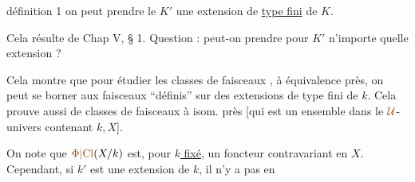définition 1 on peut prendre le $K'$ une extension de \uline{type fini} de $K$.

Cela résulte de Chap V, § 1. Question : peut-on prendre pour $K'$ n'importe quelle extension \uline{} ?

Cela montre que pour étudier les  classes de faisceaux , à équivalence près, on peut se borner aux faisceaux ``définis'' sur des extensions de type fini de $k$.
Cela prouve aussi   de classes de faisceaux à isom. près [qui est un ensemble dans le $\unsure{\mathcal U}$-univers   contenant $k,X$]. 

On note que  $\unsure{\Phi|\mathrm{Cl}}(X/k)$ est, pour \uline{$k$ fixé}, un foncteur contravariant en $X$. Cependant, si $k'$ est une extension de $k$, il n'y a pas en
